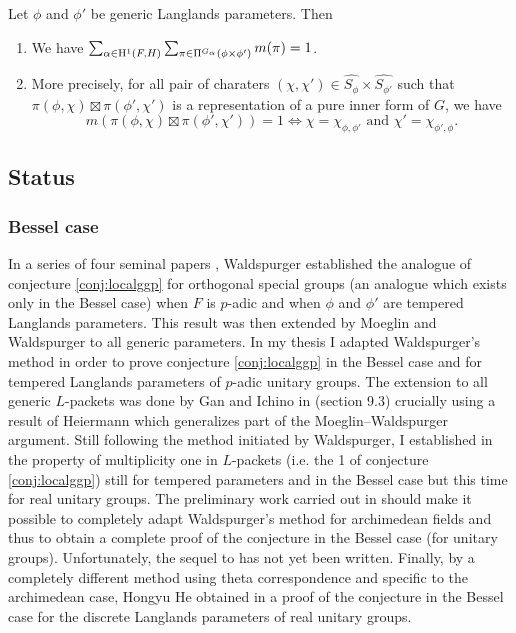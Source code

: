 \begin{conjecture}
\label{conj:localggp}
Let $\phi$ and $\phi'$ be generic Langlands parameters.
Then
\begin{enumerate}
    \item We have $\sum_{\alpha \in \mathrm{H}^1(F, H)} \sum_{\pi \in \Pi^{G_\alpha}(\phi \times \phi')} m(\pi) = 1$.
    \item More precisely, for all pair of charaters $(\chi, \chi') \in \widehat{S_\phi} \times \widehat{S_{\phi'}}$ such that $\pi(\phi, \chi) \boxtimes \pi(\phi', \chi')$ is a representation of a pure inner form of $G$, we have
    \[
        m(\pi(\phi, \chi) \boxtimes \pi(\phi', \chi')) = 1 \Leftrightarrow \chi = \chi_{\phi, \phi'}\text{ and }\chi' = \chi_{\phi', \phi}.
    \]
\end{enumerate}
\end{conjecture}


\subsection{Status}

\subsubsection{Bessel case}

In a series of four seminal papers \cite{waldspurger1990demonstration,waldspurger2010formule,waldspurger2012calcul,waldspurger2012conjecture}, Waldspurger established the analogue of conjecture \ref{conj:localggp} for orthogonal special groups (an analogue which exists only in the Bessel case) when $F$ is $p$-adic and when $\phi$ and $\phi'$ are tempered Langlands parameters.
This result was then extended by Moeglin and Waldspurger \cite{moeglin2012conjecture} to all generic parameters.
In my thesis \cite{beuzart2014expression,beuzart2015endoscopie,beuzart2016conjecture} I adapted Waldspurger's method in order to prove conjecture \ref{conj:localggp} in the Bessel case and for tempered Langlands parameters of $p$-adic unitary groups.
The extension to all generic $L$-packets was done by Gan and Ichino in \cite{gan2016gross} (section 9.3) crucially using a result of Heiermann \cite{heiermann2016note} which generalizes part of the Moeglin--Waldspurger argument.
Still following the method initiated by Waldspurger, I established in \cite{beuzart2015local} the property of multiplicity one in $L$-packets (i.e. the 1 of conjecture \ref{conj:localggp}) still for tempered parameters and in the Bessel case but this time for real unitary groups. 
The preliminary work carried out in \cite{beuzart2015local} should make it possible to completely adapt Waldspurger's method for archimedean fields and thus to obtain a complete proof of the conjecture in the Bessel case (for unitary groups).
Unfortunately, the sequel to \cite{beuzart2015local} has not yet been written.
Finally, by a completely different method using theta correspondence and specific to the archimedean case, Hongyu He obtained in \cite{he2017gan} a proof of the conjecture in the Bessel case for the discrete Langlands parameters of real unitary groups.


